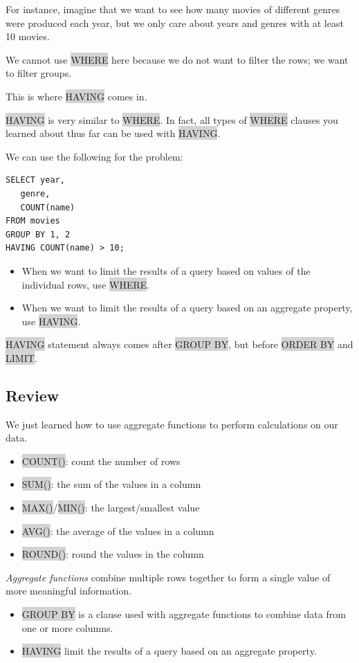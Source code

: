 \documentclass[11pt]{article}
\begin{document}
{{For instance, imagine that we want to see how many movies of different genres were produced each year, but we only care about years and genres with at least 10 movies.

We cannot use \colorbox{lightgray}{WHERE} here because we do not want to filter the rows; we want to filter groups.

This is where \colorbox{lightgray}{HAVING} comes in.

\colorbox{lightgray}{HAVING} is very similar to \colorbox{lightgray}{WHERE}. In fact, all types of \colorbox{lightgray}{WHERE} clauses you learned about thus far can be used with \colorbox{lightgray}{HAVING}.

We can use the following for the problem:
\begin{lstlisting}
SELECT year,
   genre,
   COUNT(name)
FROM movies
GROUP BY 1, 2
HAVING COUNT(name) > 10;
\end{lstlisting}
\begin{itemize}[leftmargin = *]
\item When we want to limit the results of a query based on values of the individual rows, use \colorbox{lightgray}{WHERE}.
\item When we want to limit the results of a query based on an aggregate property, use \colorbox{lightgray}{HAVING}.
\end{itemize}
\colorbox{lightgray}{HAVING} statement always comes after \colorbox{lightgray}{GROUP BY}, but before \colorbox{lightgray}{ORDER BY} and \colorbox{lightgray}{LIMIT}.

\subsection{Review}

We just learned how to use aggregate functions to perform calculations on our data.
\begin{itemize}[leftmargin = *]
\item \colorbox{lightgray}{COUNT()}: count the number of rows
\item \colorbox{lightgray}{SUM()}: the sum of the values in a column
\item \colorbox{lightgray}{MAX()}/\colorbox{lightgray}{MIN()}: the largest/smallest value
\item \colorbox{lightgray}{AVG()}: the average of the values in a column
\item \colorbox{lightgray}{ROUND()}: round the values in the column
\end{itemize}
\textit{Aggregate functions} combine multiple rows together to form a single value of more meaningful information.
\begin{itemize}[leftmargin = *]
\item \colorbox{lightgray}{GROUP BY} is a clause used with aggregate functions to combine data from one or more columns.
\item \colorbox{lightgray}{HAVING} limit the results of a query based on an aggregate property.
\end{itemize}

}}
\end{document}

